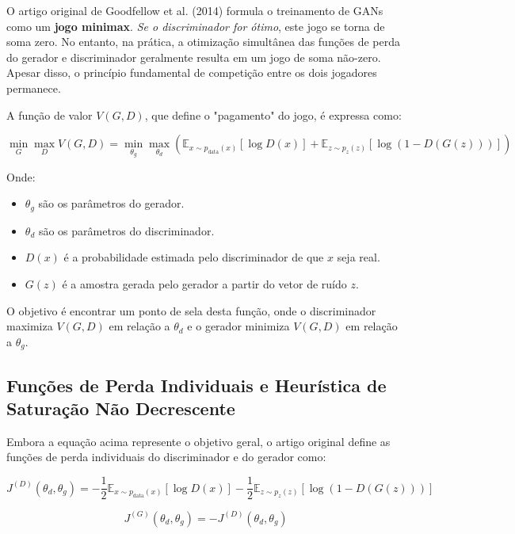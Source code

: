 \documentclass{article}
\begin{document}
O artigo original de Goodfellow et al. (2014) formula o treinamento de GANs como um \textbf{jogo minimax}. \textit{Se o discriminador for ótimo}, este jogo se torna de soma zero. No entanto, na prática, a otimização simultânea das funções de perda do gerador e discriminador geralmente resulta em um jogo de soma não-zero. Apesar disso, o princípio fundamental de competição entre os dois jogadores permanece.

A função de valor $V(G, D)$, que define o "pagamento" do jogo, é expressa como:

\begin{equation}
    \min_G \max_D V(G, D) = \min_{\theta_g} \max_{\theta_d} \left( \mathbb{E}_{x \sim p_{\text{data}}(x)} \left[ \log D(x) \right] + \mathbb{E}_{z \sim p_z(z)} \left[ \log (1 - D(G(z))) \right] \right)
\end{equation}

Onde:
\begin{itemize}
    \item $\theta_g$ são os parâmetros do gerador.
    \item $\theta_d$ são os parâmetros do discriminador.
    \item $D(x)$ é a probabilidade estimada pelo discriminador de que $x$ seja real.
    \item $G(z)$ é a amostra gerada pelo gerador a partir do vetor de ruído $z$.
\end{itemize}

O objetivo é encontrar um ponto de sela desta função, onde o discriminador maximiza $V(G, D)$ em relação a $\theta_d$ e o gerador minimiza $V(G, D)$ em relação a $\theta_g$.

\subsection{Funções de Perda Individuais e Heurística de Saturação Não Decrescente}

Embora a equação acima represente o objetivo geral, o artigo original define as funções de perda individuais do discriminador e do gerador como:

\begin{equation}
    J^{(D)}(\theta_d, \theta_g) = - \frac{1}{2} \mathbb{E}_{x \sim p_{\text{data}}(x)} \left[ \log D(x) \right] - \frac{1}{2} \mathbb{E}_{z \sim p_z(z)} \left[ \log (1 - D(G(z))) \right]
\end{equation}

\begin{equation}
    J^{(G)}(\theta_d, \theta_g) = - J^{(D)}(\theta_d, \theta_g)
\end{equation}
\end{document}
